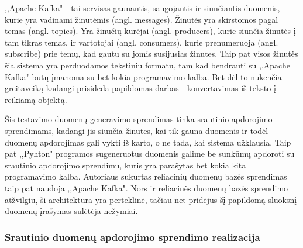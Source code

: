 \documentclass{VUMIFPSkursinis}
\begin{document}
,,Apache Kafka" - tai servisas gaunantis, saugojantis ir siunčiantis duomenis, kurie yra vadinami žinutėmis (angl. messages). Žinutės yra skirstomos pagal temas (angl. topics).
Yra žinučių kūrėjai (angl. producers), kurie siunčia žinutės į tam tikras temas, ir vartotojai (angl. consumers), kurie prenumeruoja (angl. subscribe)
prie temų, kad gautu su jomis susijusias žinutes\cite{thein2014apache}.  Taip pat visos žinutės šia sistema yra perduodamos tekstiniu formatu, 
tam kad bendrauti su ,,Apache Kafka" būtų įmanoma su bet kokia programavimo kalba. Bet dėl to nukenčia greitaveiką kadangi prisideda
papildomas darbas - konvertavimas iš teksto į reikiamą objektą.\par
Šis testavimo duomenų generavimo sprendimas tinka srautinio apdorojimo sprendimams, kadangi jis siunčia žinutes,
kai tik gauna duomenis ir todėl duomenų apdorojimas gali vykti iš karto, o ne tada, kai sistema užklausia. Taip pat ,,Pyhton" programos sugeneruotus duomenis galime
be sunkūmų apdoroti su srautinio apdorojimo sprendimu, kuris yra parašytas bet kokia kita programavimo kalba. 
Autoriaus sukurtas reliacinių duomenų bazės sprendimas taip pat naudoja ,,Apache Kafka". Nors ir reliacinės duomenų bazės sprendimo atžvilgiu, ši architektūra yra perteklinė, 
tačiau net pridėjus šį papildomą sluoksnį duomenų įrašymas sulėtėja nežymiai.\par

\subsubsection{Srautinio duomenų apdorojimo sprendimo realizacija}
\end{document}
